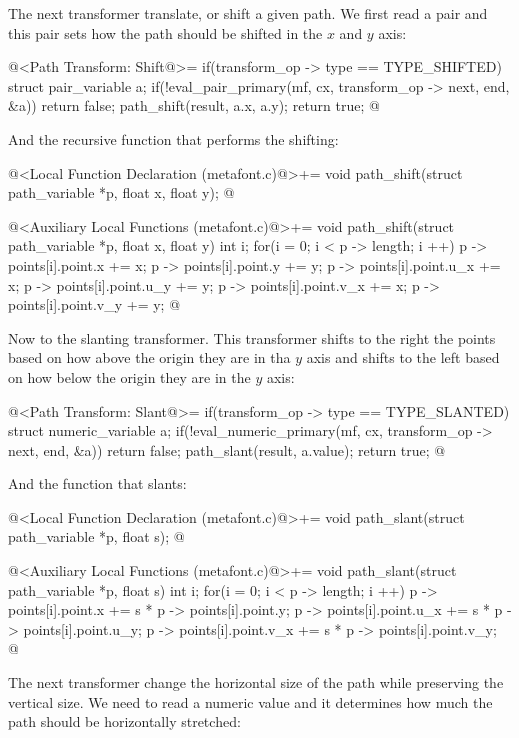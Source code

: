 {{{{{The next transformer translate, or shift a given path. We first read a
pair and this pair sets how the path should be shifted in the $x$ and
$y$ axis:

\iniciocodigo
@<Path Transform: Shift@>=
if(transform_op -> type == TYPE_SHIFTED){
  struct pair_variable a;
  if(!eval_pair_primary(mf, cx, transform_op -> next, end, &a))
    return false;
  path_shift(result, a.x, a.y);  
  return true;
}
@
\fimcodigo

And the recursive function that performs the shifting:

\iniciocodigo
@<Local Function Declaration (metafont.c)@>+=
void path_shift(struct path_variable *p, float x, float y);
@
\fimcodigo

\iniciocodigo
@<Auxiliary Local Functions (metafont.c)@>+=
void path_shift(struct path_variable *p, float x, float y){
  int i;
  for(i = 0; i < p -> length; i ++){
    p -> points[i].point.x += x;
    p -> points[i].point.y += y;
    p -> points[i].point.u_x += x;
    p -> points[i].point.u_y += y;
    p -> points[i].point.v_x += x;
    p -> points[i].point.v_y += y;
  }
}
@
\fimcodigo

Now to the slanting transformer. This transformer shifts to the right
the points based on how above the origin they are in tha $y$ axis and
shifts to the left based on how below the origin they are in the $y$
axis:

\iniciocodigo
@<Path Transform: Slant@>=
if(transform_op -> type == TYPE_SLANTED){
  struct numeric_variable a;
  if(!eval_numeric_primary(mf, cx, transform_op -> next, end, &a))
    return false;
  path_slant(result, a.value);  
  return true;
}
@
\fimcodigo

And the function that slants:

\iniciocodigo
@<Local Function Declaration (metafont.c)@>+=
void path_slant(struct path_variable *p, float s);
@
\fimcodigo

\iniciocodigo
@<Auxiliary Local Functions (metafont.c)@>+=
void path_slant(struct path_variable *p, float s){
  int i;
  for(i = 0; i < p -> length; i ++){
    p -> points[i].point.x += s * p -> points[i].point.y;
    p -> points[i].point.u_x += s * p -> points[i].point.u_y;
    p -> points[i].point.v_x += s * p -> points[i].point.v_y;
  }
}
@
\fimcodigo


The next transformer change the horizontal size of the path while
preserving the vertical size. We need to read a numeric value and it
determines how much the path should be horizontally stretched:

}}}}}
